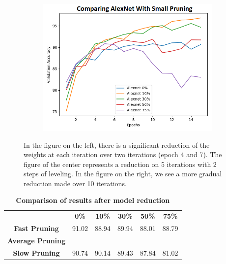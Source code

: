 \documentclass[12pt]{article}
\begin{document}
\begin{figure}[H]
\begin{subfigure}[b]{0.33\textwidth}
		\label{fig:pruneratioslow}
	\end{subfigure}
	\begin{subfigure}[b]{0.33\textwidth}
		\centering
		\includegraphics[width=\textwidth]{prune_ratio_slow}
		\label{fig:pruneratioslow}
	\end{subfigure}
	\caption{In the figure on the left, there is a significant reduction of the weights at each iteration over two iterations (epoch 4 and 7). The figure of the center represents a reduction on 5 iterations with 2 steps of leveling. In the figure on the right, we see a more gradual reduction made over 10 iterations.}
\end{figure}

\begin{table}[H]
	\centering
	\caption {\textbf{Comparison of results after model reduction}}
	\begin{tabular}{clllll}
		\textbf{}                & \multicolumn{1}{c}{\textbf{0\%}} & \multicolumn{1}{c}{\textbf{10\%}} & \multicolumn{1}{c}{\textbf{30\%}} & \multicolumn{1}{c}{\textbf{50\%}} & \multicolumn{1}{c}{\textbf{75\%}} \\
		\textbf{Fast Pruning}    & 91.02                            & 88.94                             & 89.94                             & 88.01                             & 88.79                             \\
		\textbf{Average Pruning} &                                  &                                   &                                   &                                   &                                   \\
		\textbf{Slow Pruning}    & 90.74                            & 90.14                             & 89.43                             & 87.84                             & 81.02                            
	\end{tabular}
\end{table}
\end{document}
